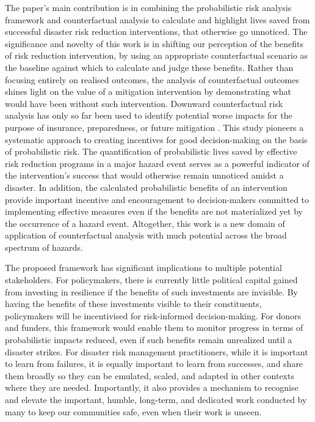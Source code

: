 The paper’s main contribution is in combining the probabilistic risk analysis framework and counterfactual analysis to calculate and highlight lives saved from successful disaster risk reduction interventions, that otherwise go unnoticed. The significance and novelty of this work is in shifting our perception of the benefits of risk reduction intervention, by using an appropriate counterfactual scenario as the baseline against which to calculate and judge these benefits. Rather than focusing entirely on realised outcomes, the analysis of counterfactual outcomes shines light on the value of a mitigation intervention by demonstrating what would have been without such intervention. Downward counterfactual risk analysis has only so far been used to identify potential worse impacts for the purpose of insurance, preparedness, or future mitigation \citep[e.g.][]{lin2020modeling, aspinall2019counterfactual, woo2019downward, woo2018counterfactual, shepherd2018storylines, woo2017reimagining, oughton2019stochastic, aspinall2019counterfactual}. This study pioneers a systematic approach to creating incentives for good decision-making on the basis of probabilistic risk. The quantification of probabilistic lives saved by effective risk reduction programs in a major hazard event serves as a powerful indicator of the intervention's success that would otherwise remain unnoticed amidst a disaster. In addition, the calculated probabilistic benefits of an intervention provide important incentive and encouragement to decision-makers committed to implementing effective measures even if the benefits are not materialized yet by the occurrence of a hazard event. Altogether, this work is a new domain of application of counterfactual analysis with much potential across the broad spectrum of hazards. 

The proposed framework has significant implications to multiple potential stakeholders. For policymakers, there is currently little political capital gained from investing in resilience if the benefits of such investments are invisible. By having the benefits of these investments visible to their constituents, policymakers will be incentivised for risk-informed decision-making. For donors and funders, this framework would enable them to monitor progress in terms of probabilistic impacts reduced, even if such benefits remain unrealized until a disaster strikes. For disaster risk management practitioners, while it is important to learn from failures, it is equally important to learn from successes, and share them broadly so they can be emulated, scaled, and adapted in other contexts where they are needed. Importantly, it also provides a mechanism to recognise and elevate the important, humble, long-term, and dedicated work conducted by many to keep our communities safe, even when their work is unseen.

